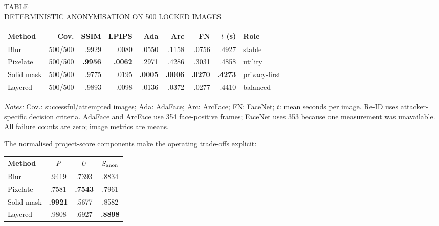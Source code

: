 \documentclass[10pt,twocolumn]{IEEEtran}
\begin{document}
\begin{center}
\begin{minipage}{\columnwidth}
\centering
{}\label{tab:rq2-deterministic}
{\footnotesize TABLE~\thetable\\
DETERMINISTIC ANONYMISATION ON 500 LOCKED IMAGES\par}
\vspace{4pt}
\fontsize{7.0}{8.4}\selectfont
\setlength{\tabcolsep}{1.25pt}
\renewcommand{\arraystretch}{1.16}
\begin{tabular*}{\columnwidth}{@{\extracolsep{\fill}}p{}rrrrrrrp{}@{}}
\hline
\textbf{Method} & \textbf{Cov.} & \textbf{SSIM} & \textbf{LPIPS} &
\textbf{Ada} & \textbf{Arc} & \textbf{FN} & \textbf{$t$ (s)} & \textbf{Role} \\
\hline
Blur & 500/500 & .9929 & .0080 & .0550 & .1158 & .0756 & .4927 & stable \\
Pixelate & 500/500 & \textbf{.9956} & \textbf{.0062} & .2971 & .4286 & .3031 & .4858 & utility \\
Solid mask & 500/500 & .9775 & .0195 & \textbf{.0005} & \textbf{.0006} & \textbf{.0270} & \textbf{.4273} & privacy-first \\
Layered & 500/500 & .9893 & .0098 & .0136 & .0372 & .0277 & .4410 & balanced \\
\hline
\end{tabular*}
\vspace{5pt}

\raggedright\footnotesize \textit{Notes:} Cov.: successful/attempted images;
Ada: AdaFace; Arc: ArcFace; FN: FaceNet; $t$: mean seconds per image. Re-ID uses
attacker-specific decision criteria. AdaFace and ArcFace use 354 face-positive
frames; FaceNet uses 353 because one measurement was unavailable. All failure
counts are zero; image metrics are means.
\par\vspace{3pt}
\end{minipage}
\end{center}

The normalised project-score components make the operating trade-offs explicit:
\begin{center}
\footnotesize
\renewcommand{\arraystretch}{1.12}
\begin{tabular}{@{}lccc@{}}
\hline
\textbf{Method} & \textbf{$P$} & \textbf{$U$} & \textbf{$S_{\rm anon}$} \\
\hline
Blur & .9419 & .7393 & .8834 \\
Pixelate & .7581 & \textbf{.7543} & .7961 \\
Solid mask & \textbf{.9921} & .5677 & .8582 \\
Layered & .9808 & .6927 & \textbf{.8898} \\
\hline
\end{tabular}
\end{center}
\end{document}

